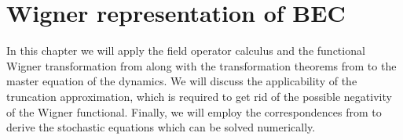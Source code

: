 \chapter{Wigner representation of BEC}
\label{cha:wigner-bec}

In this chapter we will apply the field operator calculus and the functional Wigner transformation from  along with the transformation theorems from  to the master equation of the  dynamics.
We will discuss the applicability of the truncation approximation, which is required to get rid of the possible negativity of the Wigner functional.
Finally, we will employ the correspondences from  to derive the stochastic equations which can be solved numerically.









